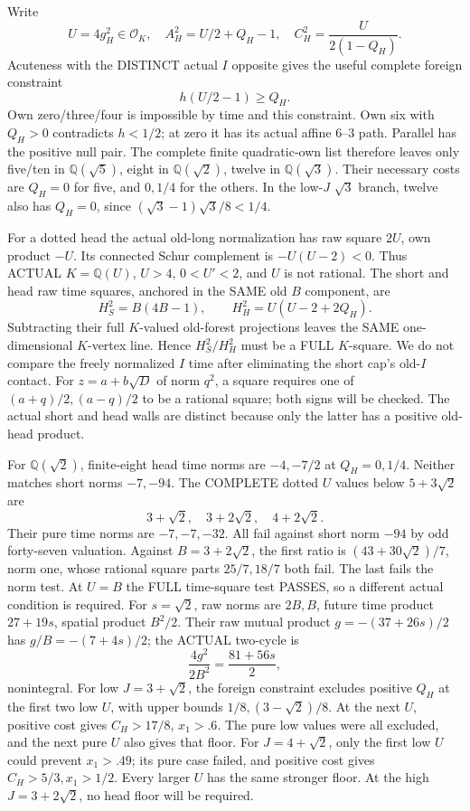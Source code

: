 \documentclass[11pt]{article}
\begin{document}
Write
\[
 U=4g_H^2\in\mathcal O_K,\quad
 A_H^2=U/2+Q_H-1,\quad
 C_H^2={\frac{U}{2(1-Q_H)}} .
\]
Acuteness with the DISTINCT actual \(I\)
opposite gives the useful complete foreign
constraint
\[
                             h(U/2-1)\ge Q_H .
\]
Own zero/three/four is impossible by time
and this constraint.
Own six with \(Q_H>0\) contradicts
\(h<1/2\); at zero it has its actual
affine \(6\)--\(3\) path.
Parallel has the positive null pair.
The complete finite quadratic-own list
therefore leaves only five/ten in
\(\mathbb Q(\sqrt5)\), eight in
\(\mathbb Q(\sqrt2)\), twelve in
\(\mathbb Q(\sqrt3)\).
Their necessary costs are \(Q_H=0\)
for five, and \(0,1/4\) for the others.
In the low-\(J\) \(\sqrt3\) branch,
twelve also has \(Q_H=0\), since
\((\sqrt3-1)\sqrt3/8<1/4\).

For a dotted head the actual
old-long normalization has raw square
\(2U\), own product \(-U\).
Its connected Schur complement is
\(-U(U-2)<0\).
Thus ACTUAL \(K=\mathbb Q(U)\),
\(U>4\), \(0<U'<2\), and \(U\) is
not rational.
The short and head raw time squares,
anchored in the SAME old \(B\) component,
are
\[
                        H_S^2=B(4B-1),\qquad
                        H_H^2=U(U-2+2Q_H).
\]
Subtracting their full \(K\)-valued
old-forest projections leaves the SAME
one-dimensional \(K\)-vertex line.
Hence \(H_S^2/H_H^2\) must be a FULL
\(K\)-square.
We do not compare the freely normalized
\(I\) time after eliminating the short
cap's old-\(I\) contact.
For \(z=a+b\sqrt D\) of norm \(q^2\),
a square requires one of
\((a+q)/2,(a-q)/2\) to be a rational
square; both signs will be checked.
The actual short and head walls are
distinct because only the latter has
a positive old-head product.

For \(\mathbb Q(\sqrt2)\), finite-eight
head time norms are \(-4,-7/2\)
at \(Q_H=0,1/4\).
Neither matches short norms \(-7,-94\).
The COMPLETE dotted \(U\) values below
\(5+3\sqrt2\) are
\[
                         3+\sqrt2,\quad3+2\sqrt2,\quad4+2\sqrt2 .
\]
Their pure time norms are \(-7,-7,-32\).
All fail against short norm \(-94\)
by odd forty-seven valuation.
Against \(B=3+2\sqrt2\), the first
ratio is \((43+30\sqrt2)/7\),
norm one, whose rational square parts
\(25/7,18/7\) both fail.
The last fails the norm test.
At \(U=B\) the FULL time-square test
PASSES, so a different actual condition
is required.
For \(s=\sqrt2\), raw norms are \(2B,B\),
future time product \(27+19s\), spatial
product \(B^2/2\).
Their raw mutual product \(g=-(37+26s)/2\)
has \(g/B=-(7+4s)/2\); the ACTUAL
two-cycle is
\[
                          {\frac{4g^2}{2B^2}}={\frac{81+56s}{2}},
\]
nonintegral.
For low \(J=3+\sqrt2\), the foreign
constraint excludes positive \(Q_H\)
at the first two low \(U\), with upper
bounds \(1/8,(3-\sqrt2)/8\).
At the next \(U\), positive cost gives
\(C_H>17/8\), \(x_1>.6\).
The pure low values were all excluded,
and the next pure \(U\) also gives
that floor.
For \(J=4+\sqrt2\), only the first
low \(U\) could prevent \(x_1>.49\);
its pure case failed, and positive
cost gives \(C_H>5/3,x_1>1/2\).
Every larger \(U\) has the same stronger
floor.
At the high \(J=3+2\sqrt2\), no head
floor will be required.
\end{document}
